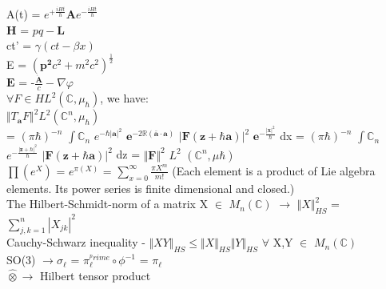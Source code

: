 \documentclass[10pt,fancy]{elegantbook}
\begin{document}
\begin{note}
A(t) = $e^{+ \frac{iHt}{h}} \mathbf {A}e^{- \frac{iHt}{h}}$  \\
  
$\mathbf H$ = $p \hat q - \mathbf L$ \\
 
ct' = $ \gamma(ct - \beta x)$ \\
 
E = $ ( \mathbf {p^2} c^2 + m^2 c^2)^ \frac{1}{2}$  \\

$ \mathbf E$ = -$ \frac{\mathbf {\dot A}}{c} - \nabla \varphi$   \\
 
$ \forall F \in H L^2(\mathbb C,\mu_\hbar)$, we have:  \\ 
$ \Vert T_\mathbf a F \Vert^2 L^2(\mathbb C^n,\mu_\hbar)$ \\
= $(\pi \hbar)^{-n}$ $\int \mathbb C_n$ $e^{- \hbar \vert \mathbf a \vert^2}$ $ \mathbf e^{-2 \mathbb R (  \bar {\mathbf a} \cdot \mathbf a ) }$ $ \vert \mathbf F (\mathbf z + \hbar \mathbf a ) \vert^2 $ $ \mathbf e^{- \frac{\vert \mathbf x \vert^2} {\hbar}} $ dx  
= $(\pi \hbar)^{-n}$ $\int \mathbb C_n$ $e^{- \frac{\vert \mathbf z + \hbar \vert^2}{\hbar}}$ $\vert \mathbf F(\mathbf z + \hbar \mathbf a) \vert^2$ dz  
= $ \Vert \mathbf F \Vert^2$ $L^2$ $ ( \mathbb C^n,\mu \hbar )$  \\
  
$\prod (e^X)$ = $e^{\pi (X)}$ = $ \sum_{x=0}^\infty \frac{\pi X^m}{m!}$ (Each element is a product of Lie algebra elements. 
                                                                         Its power series is finite dimensional and   closed.)  \\
                                                                  
The Hilbert-Schmidt-norm of a matrix X $\in$ $M_n(\mathbb C)$ $\longrightarrow$ $\Vert X \Vert^2_{HS}$ = $ \sum_{j,k = 1}^{n} |X_{jk}|^2$  \\
  
Cauchy-Schwarz inequality - $\Vert {XY} \Vert_{HS} \leq \Vert X \Vert_{HS} \Vert Y \Vert_{HS}$ $\forall$ X,Y $\in$ $M_n(\mathbb C)$  \\
 
SO(3) $\longrightarrow \sigma_{\ell}$ = $\pi^{^prime}_{\ell} \circ \phi^{-1}$ = $\pi_\ell$ \\
 
$\hat \otimes \longrightarrow$ Hilbert tensor product \\
 

\end{note}
\end{document}

